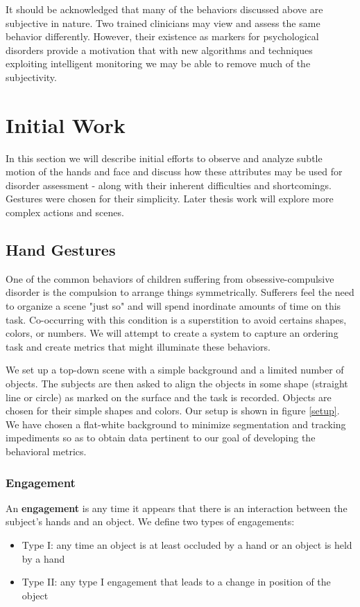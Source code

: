 \documentclass[11pt]{article}
\begin{document}
It should be acknowledged that many of the behaviors discussed above are subjective in nature. Two trained clinicians may view and assess the same behavior differently. However, their existence as markers for psychological disorders provide a motivation that with new algorithms and techniques exploiting intelligent monitoring we may be able to remove much of the subjectivity.

\section{Initial Work}
In this section we will describe initial efforts to observe and analyze subtle motion of the hands and face and discuss how these attributes may be used for disorder assessment - along with their inherent difficulties and shortcomings. Gestures were chosen for their simplicity. Later thesis work will explore more complex actions and scenes.
\subsection{Hand Gestures}
One of the common behaviors of children suffering from obsessive-compulsive disorder is the compulsion to arrange things symmetrically. Sufferers feel the need to organize a scene "just so" and will spend inordinate amounts of time on this task. Co-occurring with this condition is a superstition to avoid certains shapes, colors, or numbers. We will attempt to create a system to capture an ordering task and create metrics that might illuminate these behaviors.

We set up a top-down scene with a simple background and a limited number of objects. The subjects are then asked to align the objects in some shape (straight line or  circle) as marked on the surface and the task is recorded. Objects are chosen for their simple shapes and colors. Our setup is shown in figure \ref{setup}. We have chosen a flat-white background to minimize segmentation and tracking impediments so as to obtain data pertinent to our goal of developing the behavioral metrics.

\subsubsection{Engagement}
An \textbf{engagement} is any time it appears that there is an interaction between the subject's hands and an object. We define two types of engagements:
\begin{itemize}
\item Type I: any time an object is at least occluded by a hand or an object is held by a hand
\item Type II: any type I engagement that leads to a change in position of the object
\end{itemize}
\end{document}
